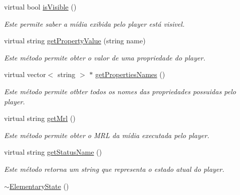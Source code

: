 \begin{DoxyCompactItemize}
virtual bool \hyperlink{classbr_1_1ufscar_1_1lince_1_1ginga_1_1wac_1_1state_1_1ElementaryState_a2e7a6f98a2b3a239f9b14f22025fc379}{isVisible} ()
\begin{DoxyCompactList}\small\item\em Este permite saber a mídia exibida pelo player está visivel. \item\end{DoxyCompactList}\item 
virtual string \hyperlink{classbr_1_1ufscar_1_1lince_1_1ginga_1_1wac_1_1state_1_1ElementaryState_aaa47390c93fda945f7ba5ee80031a137}{getPropertyValue} (string name)
\begin{DoxyCompactList}\small\item\em Este método permite obter o valor de uma propriedade do player. \item\end{DoxyCompactList}\item 
virtual vector$<$ string $>$ $\ast$ \hyperlink{classbr_1_1ufscar_1_1lince_1_1ginga_1_1wac_1_1state_1_1ElementaryState_a135050e832afa82aeff759a54087031b}{getPropertiesNames} ()
\begin{DoxyCompactList}\small\item\em Este método permite otbter todos os nomes das propriedades possuidas pelo player. \item\end{DoxyCompactList}\item 
virtual string \hyperlink{classbr_1_1ufscar_1_1lince_1_1ginga_1_1wac_1_1state_1_1ElementaryState_a3714512e115e6e66bfa55eb5694951ec}{getMrl} ()
\begin{DoxyCompactList}\small\item\em Este método permite obter o MRL da mídia executada pelo player. \item\end{DoxyCompactList}\item 
virtual string \hyperlink{classbr_1_1ufscar_1_1lince_1_1ginga_1_1wac_1_1state_1_1ElementaryState_ae1c2e7da72253acf9b5c19754994047c}{getStatusName} ()
\begin{DoxyCompactList}\small\item\em Este método retorna um string que representa o estado atual do player. \item\end{DoxyCompactList}\item 
\hyperlink{classbr_1_1ufscar_1_1lince_1_1ginga_1_1wac_1_1state_1_1ElementaryState_abd089616d40c13eb528a92984252a58f}{$\sim$ElementaryState} ()

\end{DoxyCompactItemize}
